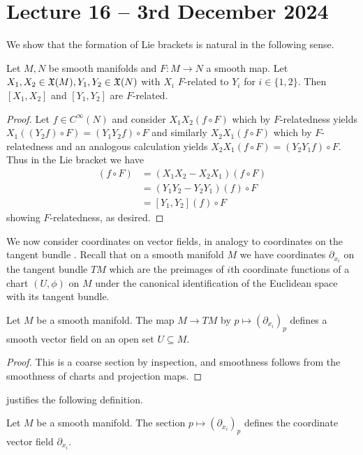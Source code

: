 \section{Lecture 16 -- 3rd December 2024}\label{sec: lecture 16}
We show that the formation of Lie brackets is natural in the following sense. 
\begin{lemma}\label{lem: naturality of Lie brackets}
    Let $M,N$ be smooth manifolds and $F:M\to N$ a smooth map. Let $X_{1},X_{2}\in\mathfrak{X}(M),Y_{1},Y_{2}\in\mathfrak{X}(N)$ with $X_{i}$ $F$-related to $Y_{i}$ for $i\in\{1,2\}$. Then $[X_{1},X_{2}]$ and $[Y_{1},Y_{2}]$ are $F$-related. 
\end{lemma}
\begin{proof}
    Let $f\in C^{\infty}(N)$ and consider $X_{1}X_{2}(f\circ F)$ which by $F$-relatedness yields $X_{1}((Y_{2}f)\circ F)=(Y_{1}Y_{2}f)\circ F$ and similarly $X_{2}X_{1}(f\circ F)$ which by $F$-relatedness and an analogous calculation yields $X_{2}X_{1}(f\circ F)=(Y_{2}Y_{1}f)\circ F$. Thus in the Lie bracket we have 
    \begin{align*}
        [X_{1},X_{2}](f\circ F) &= (X_{1}X_{2}-X_{2}X_{1})(f\circ F) \\
        &= (Y_{1}Y_{2}-Y_{2}Y_{1})(f)\circ F \\
        &= [Y_{1},Y_{2}](f)\circ F
    \end{align*}
    showing $F$-relatedness, as desired. 
\end{proof}
We now consider coordinates on vector fields, in analogy to coordinates on the tangent bundle . Recall that on a smooth manifold $M$ we have coordinates $\partial_{x_{i}}$ on the tangent bundle $TM$ which are the preimages of $i$th coordinate functions of a chart $(U,\phi)$ on $M$ under the canonical identification of the Euclidean space with its tangent bundle. 
\begin{lemma}\label{lem: coordinate vector fields are smooth}
    Let $M$ be a smooth manifold. The map $M\to TM$ by $p\mapsto (\partial_{x_{i}})_{p}$ defines a smooth vector field on an open set $U\subseteq M$. 
\end{lemma}
\begin{proof}
    This is a coarse section by inspection, and smoothness follows from the smoothness of charts and projection maps. 
\end{proof}
 justifies the following definition. 
\begin{definition}\label{def: coordinate vector field}
    Let $M$ be a smooth manifold. The section $p\mapsto(\partial_{x_{i}})_{p}$ defines the coordinate vector field $\partial_{x_{i}}$. 
\end{definition}
